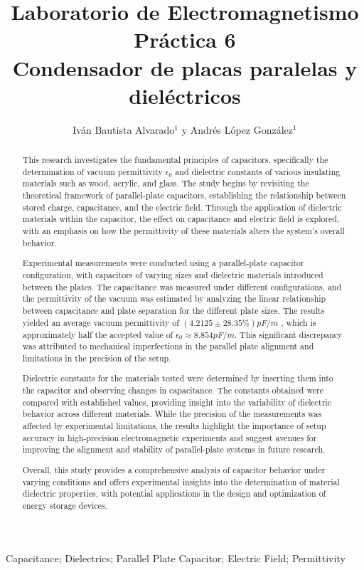 \documentclass[article,12pt]{elsarticle}
\begin{document}
\begin{frontmatter}
    \title{Laboratorio de Electromagnetismo \\  Práctica  6\\ 
        Condensador de placas paralelas y dieléctricos}
    \author{Iván Bautista Alvarado$^1$ y Andrés López González$^1$} %
    \address{$^1$ Facultad de Ciencias, Universidad Nacional Autónoma de México, M\'exico CDMX.}


    \begin{abstract}
     This research investigates the fundamental principles of capacitors, specifically the determination of vacuum permittivity $\epsilon_0$ and dielectric constants of various insulating materials such as wood, acrylic, and glass. The study begins by revisiting the theoretical framework of parallel-plate capacitors, establishing the relationship between stored charge, capacitance, and the electric field. Through the application of dielectric materials within the capacitor, the effect on capacitance and electric field is explored, with an emphasis on how the permittivity of these materials alters the system's overall behavior.

Experimental measurements were conducted using a parallel-plate capacitor configuration, with capacitors of varying sizes and dielectric materials introduced between the plates. The capacitance was measured under different configurations, and the permittivity of the vacuum was estimated by analyzing the linear relationship between capacitance and plate separation for the different plate sizes. The results yielded an average vacuum permittivity of $(4.2125 \pm 28.35 \%) pF/m$ , which is approximately half the accepted value of $\epsilon_0 \approx 8.854 pF/m$. This significant discrepancy was attributed to mechanical imperfections in the parallel plate alignment and limitations in the precision of the setup.

Dielectric constants for the materials tested were determined by inserting them into the capacitor and observing changes in capacitance. The constants obtained were compared with established values, providing insight into the variability of dielectric behavior across different materials. While the precision of the measurements was affected by experimental limitations, the results highlight the importance of setup accuracy in high-precision electromagnetic experiments and suggest avenues for improving the alignment and stability of parallel-plate systems in future research.

Overall, this study provides a comprehensive analysis of capacitor behavior under varying conditions and offers experimental insights into the determination of material dielectric properties, with potential applications in the design and optimization of energy storage devices.
    \end{abstract}

    \begin{keyword}
     Capacitance; Dielectrics; Parallel Plate Capacitor; Electric Field; Permittivity
    \end{keyword}
\end{frontmatter}
\end{document}
